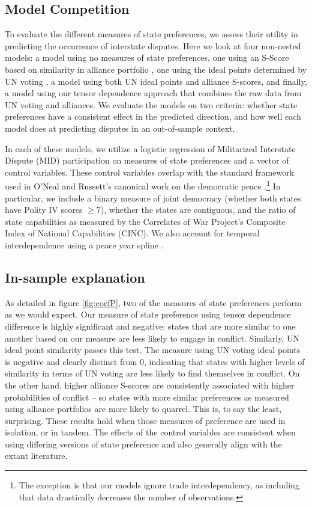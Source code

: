 \subsection*{Model Competition}

To evaluate the different measures of state preferences, we assess their utility in predicting the occurrence of interstate disputes. Here we look at four non-nested models: a model using no measures of state preferences, one using an S-Score based on similarity in alliance portfolio \citep{signorino:ritter:1999}, one using the ideal points determined by UN voting \citep{bailey:etal:2015}, a model using both UN ideal points and alliance S-scores, and finally, a model using our tensor dependence approach that combines the raw data from UN voting and alliances. We evaluate the models on two criteria: whether state preferences have a consistent effect in the predicted direction, and how well each model does at predicting disputes in an out-of-sample context.

In each of these models, we utilize a logistic regression of Militarized Interstate Dispute (MID) participation on measures of state preferences and a vector of control variables. These control variables overlap with the standard framework used in O'Neal and Russett's canonical work on the democratic peace \citep{oneal:russett:1997}.\footnote{The exception is that our models ignore trade interdependency, as including that data drastically decreases the number of observations.} In particular, we include a binary measure of joint democracy (whether both states have Polity IV scores $\geq 7$), whether the states are contiguous, and the ratio of state capabilities as measured by the Correlates of War Project's Composite Index of National Capabilities (CINC). We also account for temporal interdependence using a peace year spline \citep{carter:signorino:2010}. 

\subsection*{In-sample explanation}

As detailed in figure \ref{fig:coefP}, two of the measures of state preferences perform as we would expect. Our measure of state preference using tensor dependence difference is highly significant and negative: states that are more similar to one another based on our measure are less likely to engage in conflict. Similarly, UN ideal point similarity passes this test. The measure using UN voting ideal points is negative and clearly distinct from $0$, indicating that states with higher levels of similarity in terms of UN voting are less likely to find themselves in conflict. On the other hand, higher alliance S-scores are consistently associated with higher probabilities of conflict -- so states with more similar preferences as measured using alliance portfolios are more likely to quarrel. This is, to say the least, surprising. These results hold when those measures of preference are used in isolation, or in tandem. The effects of the control variables are consistent when using differing versions of state preference and also generally align with the extant literature.

